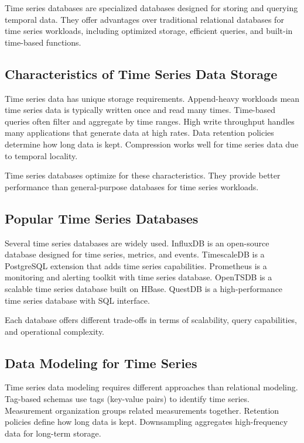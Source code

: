 Time series databases are specialized databases designed for storing and querying temporal data. They offer advantages over traditional relational databases for time series workloads, including optimized storage, efficient queries, and built-in time-based functions.

\subsection{Characteristics of Time Series Data Storage}

Time series data has unique storage requirements. Append-heavy workloads mean time series data is typically written once and read many times. Time-based queries often filter and aggregate by time ranges. High write throughput handles many applications that generate data at high rates. Data retention policies determine how long data is kept. Compression works well for time series data due to temporal locality.

Time series databases optimize for these characteristics. They provide better performance than general-purpose databases for time series workloads.

\subsection{Popular Time Series Databases}

Several time series databases are widely used. InfluxDB is an open-source database designed for time series, metrics, and events. TimescaleDB is a PostgreSQL extension that adds time series capabilities. Prometheus is a monitoring and alerting toolkit with time series database. OpenTSDB is a scalable time series database built on HBase. QuestDB is a high-performance time series database with SQL interface.

Each database offers different trade-offs in terms of scalability, query capabilities, and operational complexity.

\subsection{Data Modeling for Time Series}

Time series data modeling requires different approaches than relational modeling. Tag-based schemas use tags (key-value pairs) to identify time series. Measurement organization groups related measurements together. Retention policies define how long data is kept. Downsampling aggregates high-frequency data for long-term storage.

